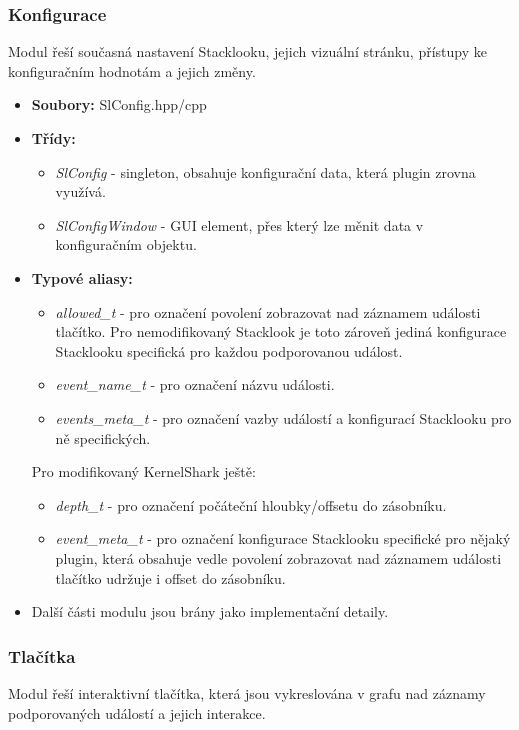\subsubsection*{Konfigurace}
Modul řeší současná nastavení Stacklooku, jejich vizuální stránku, přístupy ke konfiguračním hodnotám a jejich změny.

\begin{itemize}
  \item \textbf{Soubory:} SlConfig.hpp/cpp
  \item \textbf{Třídy:}
    \begin{itemize}
      \item \emph{SlConfig} - singleton, obsahuje konfigurační data, která plugin zrovna využívá.
      \item \emph{SlConfigWindow} - GUI element, přes který lze měnit data v konfiguračním objektu.
    \end{itemize}
  \item \textbf{Typové aliasy:}
    \begin{itemize}
      \item \emph{allowed\_t} - pro označení povolení zobrazovat nad záznamem události tlačítko. Pro nemodifikovaný Stacklook je toto zároveň jediná konfigurace Stacklooku specifická pro každou podporovanou událost.
      \item \emph{event\_name\_t} - pro označení názvu události.
      \item \emph{events\_meta\_t} - pro označení vazby událostí a konfigurací Stacklooku pro ně specifických.
    \end{itemize}

    Pro modifikovaný KernelShark ještě:
    \begin{itemize}
      \item \emph{depth\_t} - pro označení počáteční hloubky/offsetu do zásobníku.
      \item \emph{event\_meta\_t} - pro označení konfigurace Stacklooku specifické pro nějaký plugin, která obsahuje vedle povolení zobrazovat nad záznamem události tlačítko udržuje i offset do zásobníku.
    \end{itemize}
  \item Další části modulu jsou brány jako implementační detaily.
\end{itemize}

\subsubsection*{Tlačítka}
Modul řeší interaktivní tlačítka, která jsou vykreslována v grafu nad záznamy podporovaných událostí a jejich interakce.

